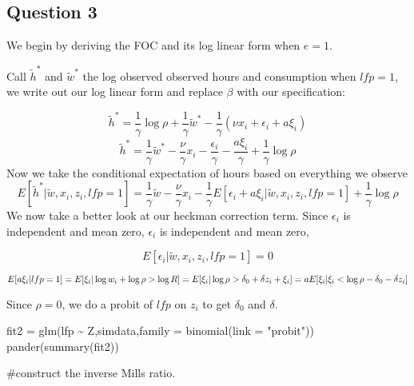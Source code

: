 \documentclass[]{article}
\newenvironment{Shaded}{\begin{snugshade}}{\end{snugshade}}
\newcommand{\AttributeTok}[1]{\textcolor[rgb]{0.77,0.63,0.00}{#1}}
\newcommand{\FunctionTok}[1]{\textcolor[rgb]{0.00,0.00,0.00}{#1}}
\newcommand{\NormalTok}[1]{#1}
\newcommand{\OtherTok}[1]{\textcolor[rgb]{0.56,0.35,0.01}{#1}}
\newcommand{\SpecialCharTok}[1]{\textcolor[rgb]{0.00,0.00,0.00}{#1}}
\newcommand{\StringTok}[1]{\textcolor[rgb]{0.31,0.60,0.02}{#1}}
\begin{document}
\hypertarget{question-3}{%
\subsection{Question 3}\label{question-3}}

We begin by deriving the FOC and its log linear form when \(e = 1\).

Call \(\tilde{h}^*\) and \(\tilde{w}^*\) the log observed observed hours
and consumption when \(lfp = 1\), we write out our log linear form and
replace \(\beta\) with our specification:

\[
 \tilde{h}^* = \frac{1}{\gamma}\log \rho + \frac{1}{\gamma}  \tilde{w}^* - \frac{1}{\gamma} (\nu x_i + \epsilon_i + a\xi_i)
\] \[
 \tilde{h}^* = \frac{1}{\gamma}  \tilde{w}^* - \frac{\nu}{\gamma}x_i - \frac{\epsilon_i}{\gamma} - \frac{a\xi_i}{\gamma} + \frac{1}{\gamma} \log \rho
\] Now we take the conditional expectation of hours based on everything
we observe \[
E[ \tilde{h}^* |\tilde{w},x_i,z_i,lfp = 1 ] = \frac{1}{\gamma} \tilde{w} - \frac{\nu}{\gamma}x_i - \frac{1}{\gamma} E[\epsilon_i + a\xi_i |\tilde{w},x_i,z_i,lfp = 1 ] + \frac{1}{\gamma} \log \rho
\] We now take a better look at our heckman correction term. Since
\(\epsilon_i\) is independent and mean zero, \(\epsilon_i\) is
independent and mean zero,

\[
E[\epsilon_i | \tilde{w},x_i,z_i,lfp = 1] = 0 
\]

\[
E[a\xi_i|lfp = 1 ] = E[\xi_i|\log w_i + \log \rho > \log R ]\\ = E[\xi_i| \log \rho > \delta_0 + \delta z_i + \xi_i ]\\ = aE[\xi_i| \xi_i < \log \rho - \delta_0 - \delta z_i ]\\
\]

Since \(\rho = 0\), we do a probit of \(lfp\) on \(z_i\) to get
\(\delta_0\) and \(\delta\).

\begin{Shaded}
\begin{Highlighting}[]
\NormalTok{fit2 }\OtherTok{=} \FunctionTok{glm}\NormalTok{(lfp }\SpecialCharTok{\textasciitilde{}}\NormalTok{ Z,simdata,}\AttributeTok{family =} \FunctionTok{binomial}\NormalTok{(}\AttributeTok{link =} \StringTok{"probit"}\NormalTok{))}
\FunctionTok{pander}\NormalTok{(}\FunctionTok{summary}\NormalTok{(fit2)) }
\end{Highlighting}
\end{Shaded}

\#construct the inverse Mills ratio.
\end{document}
